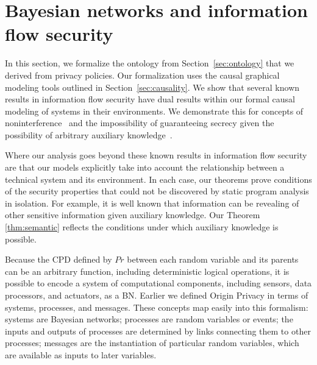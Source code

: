 \documentclass[../thesis.tex]{subfiles}
\begin{document}
\section{Bayesian networks and information flow security}
\label{sec:security}

In this section, we formalize the ontology from
Section~\ref{sec:ontology} that we derived from
privacy policies.
Our formalization uses the causal graphical modeling
tools outlined in Section~\ref{sec:causality}.
We show that several known results in information flow
security have dual results within our formal causal modeling
of systems in their environments.
We demonstrate this for concepts of 
noninterference~\cite{gm82security} and the impossibility
of guaranteeing secrecy given the possibility of
arbitrary auxiliary knowledge~\cite{dwork06icalp,dwork08jpc}.

Where our analysis goes beyond these known results
in information flow security are that our models
explicitly take into account the relationship between
a technical system and its environment.
In each case, our theorems prove conditions of the
security properties that could not be discovered
by static program analysis in isolation.
For example, it is well known that information
can be revealing of other sensitive information given
auxiliary knowledge. Our Theorem \ref{thm:semantic}
reflects the conditions
under which auxiliary knowledge is possible.

Because the CPD defined by \(Pr\) between each random
variable and its
parents can be an arbitrary function, including deterministic
logical operations, it is possible to encode a system of
computational components, including sensors, data processors,
and actuators, as a BN.
Earlier we defined Origin Privacy in terms of systems, processes,
and messages.
These concepts map easily into this formalism: systems are
Bayesian networks; processes are random variables or events;
the inputs and outputs of processes are determined by links
connecting them to other processes; messages are
the instantiation 
of particular random variables,
which are available as inputs to
later variables.

%
%
\end{document}
